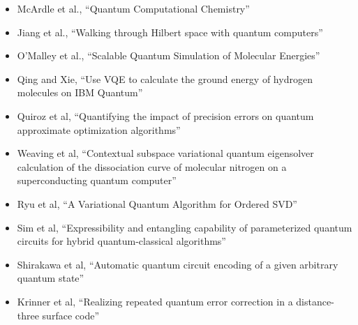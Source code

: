 \documentclass[]{article}
\begin{document}
\begin{itemize}
\item McArdle et al.\cite{mcardle2020quantum}, ``Quantum Computational Chemistry''
\item Jiang et al.\cite{jiang2025walking}, ``Walking through Hilbert space with quantum computers''
\item O'Malley et al.\cite{PhysRevX.6.031007}, ``Scalable Quantum Simulation of Molecular Energies''
\item Qing and Xie\cite{qing2023usevqecalculateground}, ``Use VQE to calculate the ground energy of hydrogen molecules on IBM Quantum''
\item Quiroz et al\cite{quiroz2025quantifying}, ``Quantifying the impact of precision errors on quantum approximate optimization algorithms''
\item Weaving et al\cite{weaving2025contextual}, ``Contextual subspace variational quantum eigensolver calculation of the dissociation curve of molecular nitrogen on a superconducting quantum computer''
\item Ryu et al\cite{VQSVD}, ``A Variational Quantum Algorithm for Ordered SVD''
\item Sim et al\cite{sim2019expressibility}, ``Expressibility and entangling capability of parameterized quantum circuits for hybrid quantum-classical algorithms''
\item Shirakawa et al\cite{PhysRevResearch.6.043008}, ``Automatic quantum circuit encoding of a given arbitrary quantum state''
\item Krinner et al\cite{krinner2022realizing}, ``Realizing repeated quantum error correction in a distance-three surface code''
\end{itemize}

\end{document}
